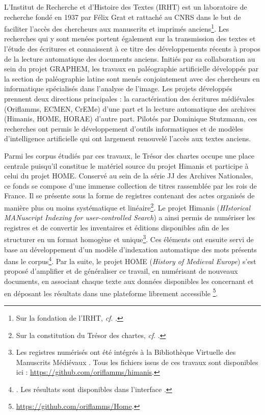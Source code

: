\documentclass[a4paper,12pt,twoside]{book}
\begin{document}
	L'Institut de Recherche et d'Histoire des Textes (IRHT) est un laboratoire de recherche fondé en 1937 par Félix Grat et rattaché au CNRS dans le but de faciliter l'accès des chercheurs aux manuscrits et imprimés anciens\footnote{Sur la fondation de l'IRHT, \textit{cf}. \cite{holtz_les_2000}.}. Les recherches qui y sont menées portent également sur la transmission des textes et l'étude des écritures et connaissent à ce titre des développements récents à propos de la lecture automatique des documents anciens. Initiés par sa collaboration au sein du projet GRAPHEM, les travaux en \og paléographie artificielle\fg{} développés par la section de paléographie latine sont menés conjointement avec des chercheurs en informatique spécialisés dans l'analyse de l'image. Les projets développés prennent deux directions principales : la caractérisation des écritures médiévales (Oriflamms, ECMEN, CrEMe) d'une part et la lecture automatique des archives (Himanis, HOME, HORAE) d'autre part. Pilotés par Dominique Stutzmann, ces recherches ont permis le développement d'outils informatiques et de modèles d'intelligence artificielle qui ont largement renouvelé l'accès aux textes anciens.
	
	Parmi les corpus étudiés par ces travaux, le Trésor des chartes occupe une place centrale puisqu'il constitue le matériel source du projet Himanis et participe à celui du projet HOME. Conservé au sein de la série JJ des Archives Nationales, ce fonds se compose d'une immense collection de titres rassemblée par les rois de France. Il se présente sous la forme de registres contenant des actes organisés de manière plus ou moins systématique et linéaire\footnote{Sur la constitution du Trésor des chartes, \textit{cf}. \cite{potin_mise_2007}.}. Le projet Himanis (\textit{HIstorical MANuscript Indexing for user-controlled Search}) a ainsi permis de numériser les registres et de convertir les inventaires et éditions disponibles afin de les structurer en un format homogène et unique\footnote{Les registres numérisés ont été intégrés à la Bibliothèque Virtuelle des Manuscrits Médiévaux \cite{noauthor_bvmm_nodate}. Tous les fichiers issus de ces travaux sont disponibles ici : \url{https://github.com/oriflamms/himanis}.}. Ces éléments ont ensuite servi de base au développement d'un modèle d'indexation automatique des mots présents dans le corpus\footnote{\cites{stutzmann_recherche_2017}. Les résultats sont disponibles dans l'interface \cite{noauthor_himanis_nodate}.}. Par la suite, le projet HOME (\textit{History of Medieval Europe}) s'est proposé d'amplifier et de généraliser ce travail, en numérisant de nouveaux documents, en associant chaque texte aux données disponibles les concernant et en déposant les résultats dans une plateforme librement accessible \footnote{\url{https://github.com/oriflamms/Home}.}.
	
\end{document}
